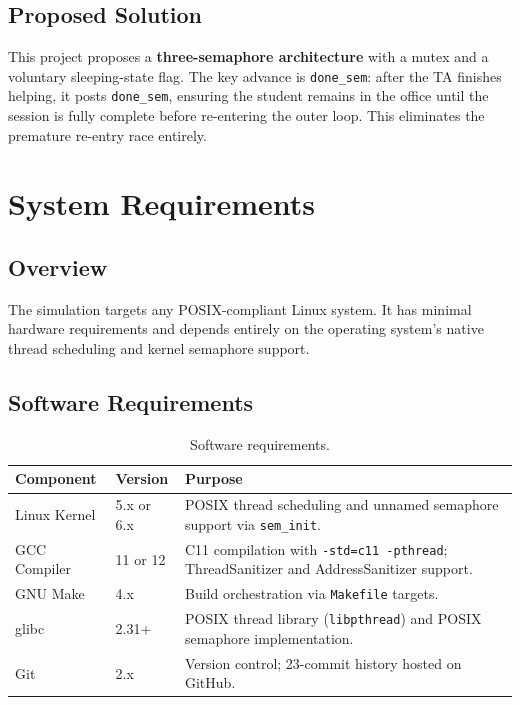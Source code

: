 \documentclass[12pt,a4paper]{report}
\begin{document}
\section{Proposed Solution}

This project proposes a \textbf{three-semaphore architecture} with a mutex and a voluntary
sleeping-state flag. The key advance is \texttt{done\_sem}: after the TA finishes helping, it
posts \texttt{done\_sem}, ensuring the student remains in the office until the session is fully
complete before re-entering the outer loop. This eliminates the premature re-entry race
entirely.

\chapter{System Requirements}

\section{Overview}

The simulation targets any POSIX-compliant Linux system. It has minimal hardware requirements
and depends entirely on the operating system's native thread scheduling and kernel semaphore
support.

\section{Software Requirements}

\begin{table}[H]
  \centering
  \caption{Software requirements.}
  \label{tab:software}
  \begin{tabularx}{\textwidth}{l l X}
    \toprule
    \textbf{Component} & \textbf{Version} & \textbf{Purpose} \\
    \midrule
    Linux Kernel     & 5.x or 6.x & POSIX thread scheduling and unnamed semaphore support via \texttt{sem\_init}. \\
    GCC Compiler     & 11 or 12   & C11 compilation with \texttt{-std=c11 -pthread}; ThreadSanitizer and AddressSanitizer support. \\
    GNU Make         & 4.x        & Build orchestration via \texttt{Makefile} targets. \\
    glibc            & 2.31+      & POSIX thread library (\texttt{libpthread}) and POSIX semaphore implementation. \\
    Git              & 2.x        & Version control; 23-commit history hosted on GitHub. \\
    \bottomrule
  \end{tabularx}
\end{table}
\end{document}
